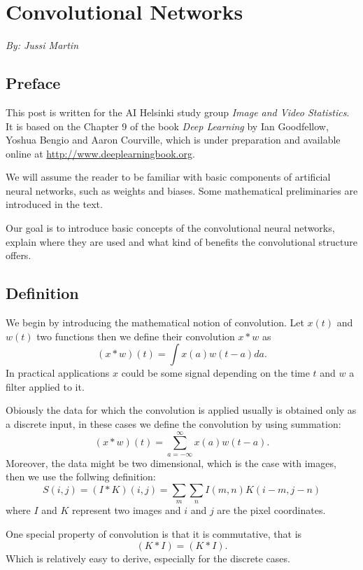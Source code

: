 \documentclass[]{article}
\begin{document}
\section{Convolutional Networks}
\begin{center}
  \emph{By: Jussi Martin}
\end{center}
\subsection{Preface}
This post is written for the AI Helsinki study group \emph{Image and Video Statistics}.
It is based on the Chapter 9 of the book \emph{Deep Learning} by Ian Goodfellow,
Yoshua Bengio and Aaron Courville, which is under preparation and available
online at \url{http://www.deeplearningbook.org}.

We will assume the reader to be familiar with basic components of artificial
neural networks, such as weights and biases. Some mathematical preliminaries are
introduced in the text.

Our goal is to introduce basic concepts of the convolutional neural networks,
explain where they are used and what kind of benefits the convolutional
structure offers.


\subsection{Definition}
We begin by introducing the mathematical notion of convolution. Let $x(t)$ and $w(t)$
two functions then we define their convolution $x * w$ as
\[
(x * w)(t) = \int x(a)w(t - a)da.
\]
In practical applications $x$ could be some signal depending on the time $t$ and
$w$ a filter applied to it.

Obiously the data for which the convolution is applied usually is obtained only
as a discrete input, in these cases we define the convolution by using
summation:
\[
(x * w)(t) = \sum_{a = -\infty}^{\infty} x(a)w(t - a).
\]
Moreover, the data might be two dimensional, which is the case with images, then
we use the follwing definition:
\[
S(i, j) = (I * K)(i, j) = \sum_m \sum_n I(m , n) K(i - m, j - n)
\]
where $I$ and $K$ represent two images and $i$ and $j$ are the pixel coordinates.

One special property of convolution is that it is commutative, that is
\[
 (K * I) = (K * I).
\]
Which is relatively easy to derive, especially for the discrete cases.
\end{document}
